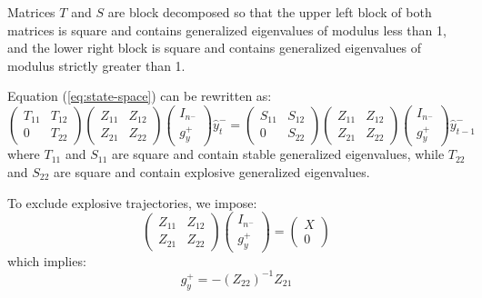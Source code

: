 \documentclass[11pt,a4paper]{article}
\begin{document}
Matrices $T$ and $S$ are block decomposed so that the upper left block of both
matrices is square and contains generalized eigenvalues of modulus less than 1,
and the lower right block is square and contains generalized eigenvalues of
modulus strictly greater than 1.

Equation (\ref{eq:state-space}) can be rewritten as:
\begin{equation}
  \label{eq:state-space-qz}
  \left(
    \begin{matrix}
      T_{11} & T_{12} \\
      0 & T_{22}
    \end{matrix}
  \right)
  \left(
    \begin{matrix}
      Z_{11} & Z_{12} \\
      Z_{21} & Z_{22}
    \end{matrix}
  \right)
  \left(
    \begin{matrix}
      I_{n^-} \\
      g^+_y
    \end{matrix}
  \right)
  \hat{y}^-_t
  =
  \left(
    \begin{matrix}
      S_{11} & S_{12} \\
      0 & S_{22}
    \end{matrix}
  \right)
  \left(
    \begin{matrix}
      Z_{11} & Z_{12} \\
      Z_{21} & Z_{22}
    \end{matrix}
  \right)
  \left(
    \begin{matrix}
      I_{n^-} \\
      g^+_y
    \end{matrix}
  \right)
  \hat{y}^-_{t-1}
\end{equation}
where $T_{11}$ and $S_{11}$ are square and contain stable generalized
eigenvalues, while $T_{22}$ and $S_{22}$ are square and contain explosive
generalized eigenvalues.

To exclude explosive trajectories, we impose:
\begin{equation}
  \label{eq:non-explosive}
  \left(
    \begin{matrix}
      Z_{11} & Z_{12} \\
      Z_{21} & Z_{22}
    \end{matrix}
  \right)
  \left(
    \begin{matrix}
      I_{n^-} \\
      g^+_y
    \end{matrix}
  \right)
  =
  \left(
    \begin{matrix}
      X \\
      0
    \end{matrix}
  \right)
\end{equation}
which implies:
\begin{equation*}
  g^+_y = -(Z_{22})^{-1} Z_{21}
\end{equation*}
\end{document}
